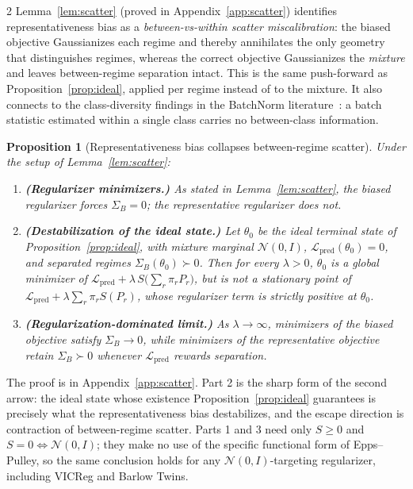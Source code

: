 \documentclass[10pt]{article}
\newtheorem{proposition}{Proposition}
\theoremstyle{remark}
\begin{document}
\begin{multicols*}{2}
Lemma~\ref{lem:scatter} (proved in Appendix~\ref{app:scatter}) identifies representativeness bias as a \emph{between-vs-within scatter miscalibration}: the biased objective Gaussianizes each regime and thereby annihilates the only geometry that distinguishes regimes, whereas the correct objective Gaussianizes the \emph{mixture} and leaves between-regime separation intact. This is the same push-forward as Proposition~\ref{prop:ideal}, applied per regime instead of to the mixture. It also connects to the class-diversity findings in the BatchNorm literature~\cite{unravelingbn2023}: a batch statistic estimated within a single class carries no between-class information.

\begin{proposition}[Representativeness bias collapses between-regime scatter]
\label{prop:scattercollapse}
Under the setup of Lemma~\ref{lem:scatter}:
\begin{enumerate}[leftmargin=*]
    \item \textbf{(Regularizer minimizers.)} As stated in Lemma~\ref{lem:scatter}, the biased regularizer forces $\Sigma_B = 0$; the representative regularizer does not.
    \item \textbf{(Destabilization of the ideal state.)} Let $\theta_0$ be the ideal terminal state of Proposition~\ref{prop:ideal}, with mixture marginal $\mathcal{N}(0,I)$, $\mathcal{L}_{\mathrm{pred}}(\theta_0) = 0$, and separated regimes $\Sigma_B(\theta_0) \succ 0$. Then for every $\lambda > 0$, $\theta_0$ is a global minimizer of $\mathcal{L}_{\mathrm{pred}} + \lambda\, S\bigl(\sum_r \pi_r P_r\bigr)$, but is not a stationary point of $\mathcal{L}_{\mathrm{pred}} + \lambda \sum_r \pi_r S(P_r)$, whose regularizer term is strictly positive at $\theta_0$.
    \item \textbf{(Regularization-dominated limit.)} As $\lambda \to \infty$, minimizers of the biased objective satisfy $\Sigma_B \to 0$, while minimizers of the representative objective retain $\Sigma_B \succ 0$ whenever $\mathcal{L}_{\mathrm{pred}}$ rewards separation.
\end{enumerate}
\end{proposition}

The proof is in Appendix~\ref{app:scatter}. Part 2 is the sharp form of the second arrow: the ideal state whose existence Proposition~\ref{prop:ideal} guarantees is precisely what the representativeness bias destabilizes, and the escape direction is contraction of between-regime scatter. Parts 1 and 3 need only $S \ge 0$ and $S = 0 \Leftrightarrow \mathcal{N}(0,I)$; they make no use of the specific functional form of Epps--Pulley, so the same conclusion holds for any $\mathcal{N}(0,I)$-targeting regularizer, including VICReg and Barlow Twins.


\end{multicols*}
\end{document}
